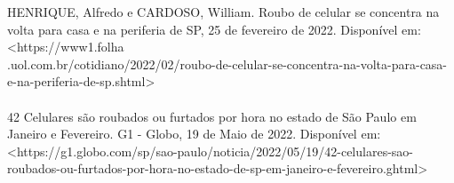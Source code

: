 

\noindent
HENRIQUE, Alfredo e CARDOSO, William. Roubo de celular se concentra na volta para casa e na periferia de SP, 25 de fevereiro de 2022. 
Disponível em: <https://www1.folha\\.uol.com.br/cotidiano/2022/02/roubo-de-celular-se-concentra-na-volta-para-casa-e-na-periferia-de-sp.shtml> 
\\ \\
42 Celulares são roubados ou furtados por hora no estado de São Paulo em Janeiro e Fevereiro. G1 - Globo, 19 de Maio de 2022.
Disponível em: <https://g1.globo.com/sp/sao-paulo/noticia/2022/05/19/42-celulares-sao-roubados-ou-furtados-por-hora-no-estado-de-sp-em-janeiro-e-fevereiro.ghtml>